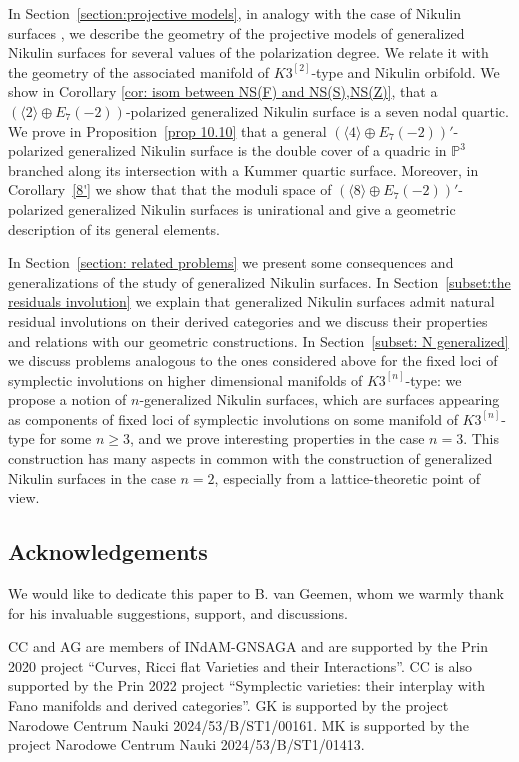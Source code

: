 \documentclass{amsart}
\theoremstyle{definition}
\numberwithin{equation}{section}
\numberwithin{equation}{section} \theoremstyle{definition}
\begin{document}
In Section~\ref{section:projective models}, in analogy with the case of Nikulin
surfaces \cite{FV, vGS, GS, V}, we describe the geometry of the projective models
of generalized Nikulin surfaces for several values of the polarization degree. We
relate it with the geometry of the associated manifold of $K3^{[2]}$-type and Nikulin
orbifold. We show
in Corollary \ref{cor: isom between NS(F) and NS(S),NS(Z)}, that a $(\langle 2\rangle\oplus E_7(-2))$-polarized generalized Nikulin surface is a seven nodal quartic.
We prove in Proposition~\ref{prop 10.10} that a general
$(\langle 4\rangle\oplus E_7(-2))'$-polarized generalized Nikulin surface is the
double cover of a quadric in $\mathbb{P}^3$ branched along its intersection with a
Kummer quartic surface. Moreover, in Corollary~\ref{8'} we show that that the moduli space of
$(\langle 8\rangle \oplus E_7(-2))'$-polarized generalized Nikulin surfaces is
unirational and give a geometric description of its general elements.


In Section~\ref{section: related problems} we present some consequences and
generalizations of the study of generalized Nikulin surfaces.
In Section~\ref{subset:the residuals involution} we explain that generalized Nikulin
surfaces admit natural residual involutions \cite{El} on their derived categories and
we discuss their properties and relations with our geometric constructions.
In Section~\ref{subset: N generalized} we discuss problems analogous to the ones
considered above for the fixed loci of symplectic involutions on higher dimensional
 manifolds of $K3^{[n]}$-type: we propose a notion of $n$-generalized Nikulin surfaces,
which are surfaces appearing as components of fixed loci of symplectic involutions on
some  manifold of $K3^{[n]}$-type for some $n\geq 3$, and we prove interesting properties in the case $n=3$. This construction has many aspects in common with the construction of generalized Nikulin surfaces in the case $n=2$, especially from a lattice-theoretic point of view.


\subsection*{Acknowledgements}

We would like to dedicate this paper to B. van Geemen, whom we warmly thank for his invaluable suggestions, support, and discussions.

CC and AG are members of INdAM-GNSAGA and are supported by the Prin 2020 project ``Curves, Ricci flat Varieties and their Interactions''. CC is also supported by the Prin 2022 project ``Symplectic varieties: their interplay with Fano manifolds and derived categories''.
GK is supported by the project Narodowe Centrum Nauki 2024/53/B/ST1/00161.
MK is supported by the project Narodowe Centrum Nauki 2024/53/B/ST1/01413.
\end{document}

